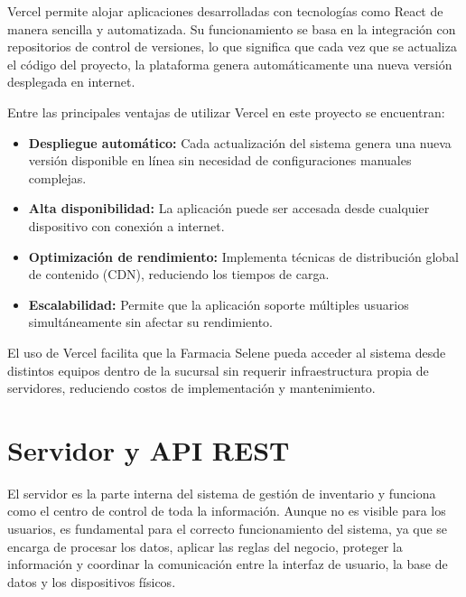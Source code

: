 Vercel permite alojar aplicaciones desarrolladas con tecnologías como React de manera sencilla y automatizada. Su funcionamiento se basa en la integración con repositorios de control de versiones, lo que significa que cada vez que se actualiza el código del proyecto, la plataforma genera automáticamente una nueva versión desplegada en internet.

Entre las principales ventajas de utilizar Vercel en este proyecto se encuentran:

\begin{itemize}
    \item \textbf{Despliegue automático:} Cada actualización del sistema genera una nueva versión disponible en línea sin necesidad de configuraciones manuales complejas.
    \item \textbf{Alta disponibilidad:} La aplicación puede ser accesada desde cualquier dispositivo con conexión a internet.
    \item \textbf{Optimización de rendimiento:} Implementa técnicas de distribución global de contenido (CDN), reduciendo los tiempos de carga.
    \item \textbf{Escalabilidad:} Permite que la aplicación soporte múltiples usuarios simultáneamente sin afectar su rendimiento.
\end{itemize}

El uso de Vercel facilita que la Farmacia Selene pueda acceder al sistema desde distintos equipos dentro de la sucursal sin requerir infraestructura propia de servidores, reduciendo costos de implementación y mantenimiento.















\section{Servidor y API REST}

El servidor es la parte interna del sistema de gestión de inventario y funciona como el centro de control de toda la información. Aunque no es visible para los usuarios, es fundamental para el correcto funcionamiento del sistema, ya que se encarga de procesar los datos, aplicar las reglas del negocio, proteger la información y coordinar la comunicación entre la interfaz de usuario, la base de datos y los dispositivos físicos.

